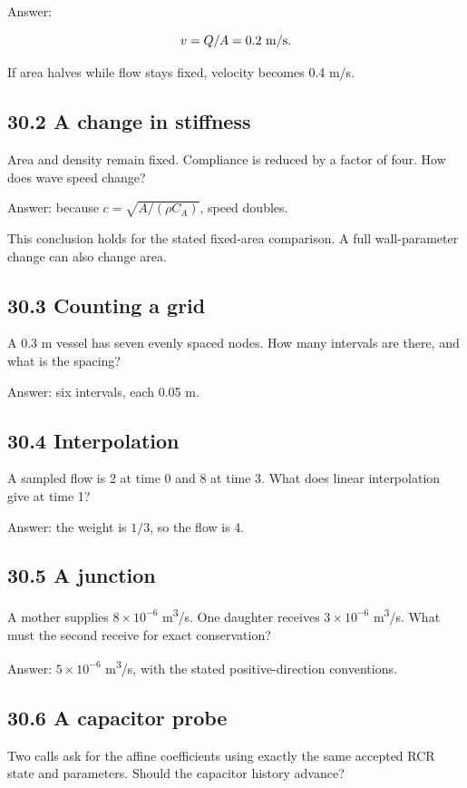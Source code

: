 \documentclass[11pt,a4paper]{article}
\begin{document}
Answer:


\begingroup\small
\[
v=Q/A=0.2\ {\rm m/s}.
\]
\endgroup


If area halves while flow stays fixed, velocity becomes 0.4 m/s.

\subsection{30.2 A change in stiffness}
Area and density remain fixed. Compliance is reduced by a factor of four. How does wave speed change?

Answer: because \(c=\sqrt{A/(\rho C_A)}\), speed doubles.

This conclusion holds for the stated fixed-area comparison. A full wall-parameter change can also change area.

\subsection{30.3 Counting a grid}
A 0.3 m vessel has seven evenly spaced nodes. How many intervals are there, and what is the spacing?

Answer: six intervals, each 0.05 m.

\subsection{30.4 Interpolation}
A sampled flow is 2 at time 0 and 8 at time 3. What does linear interpolation give at time 1?

Answer: the weight is \(1/3\), so the flow is 4.

\subsection{30.5 A junction}
A mother supplies \(8\times10^{-6}\) m\textsuperscript{3}/s. One daughter receives \(3\times10^{-6}\) m\textsuperscript{3}/s. What must the second receive for exact conservation?

Answer: \(5\times10^{-6}\) m\textsuperscript{3}/s, with the stated positive-direction conventions.

\subsection{30.6 A capacitor probe}
Two calls ask for the affine coefficients using exactly the same accepted RCR state and parameters. Should the capacitor history advance?
\end{document}
